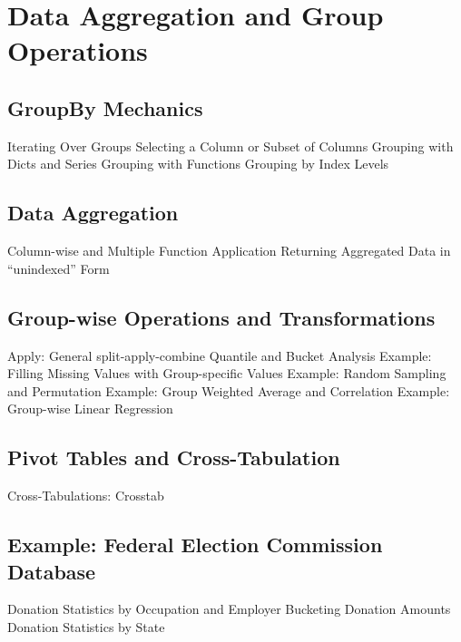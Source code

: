 
\section{Data Aggregation and Group Operations}
\subsection{GroupBy Mechanics}
Iterating Over Groups
Selecting a Column or Subset of Columns
Grouping with Dicts and Series
Grouping with Functions
Grouping by Index Levels
\subsection{Data Aggregation}
Column-wise and Multiple Function Application
Returning Aggregated Data in “unindexed” Form
\subsection{Group-wise Operations and Transformations}
Apply: General split-apply-combine
Quantile and Bucket Analysis
Example: Filling Missing Values with Group-specific Values
Example: Random Sampling and Permutation
Example: Group Weighted Average and Correlation
Example: Group-wise Linear Regression
\subsection{Pivot Tables and Cross-Tabulation}
Cross-Tabulations: Crosstab
\subsection{Example: Federal Election Commission Database}
Donation Statistics by Occupation and Employer
Bucketing Donation Amounts
Donation Statistics by State
